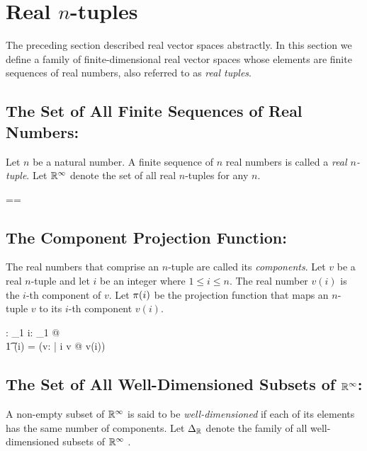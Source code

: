 \documentclass[11pt, oneside]{article}
\begin{document}
\section{Real $n$-tuples}

The preceding section described real vector spaces abstractly.
In this section we define a family of finite-dimensional real vector spaces
whose elements are finite sequences of real numbers, also referred to as \textit{real tuples}.

\subsection{The Set of All Finite Sequences of Real Numbers: }

Let $n$ be a natural number.
A finite sequence of $n$ real numbers is called a {\it real $n$-tuple}.
Let $\mathbb{R}^\infty$ denote the set of all real $n$-tuples for any $n$.

\begin{zed}
	\Rinf == \seq \R
\end{zed}

\subsection{The Component Projection Function: }

The real numbers that comprise an $n$-tuple are called its \textit{components}.
Let $v$ be a real $n$-tuple and let $i$ be an integer where $1 \le i \le n$.
The real number $v(i)$ is the $i$-th component of $v$.
Let $\operatorname{\pi}(i)$ be the projection function that maps an $n$-tuple $v$ to its $i$-th component $v(i)$.

\begin{axdef}
	\piRinf: \nat_1 \fun \Rinf \pfun \R
\where
	\forall i: \nat_1 @ \\
	\t1	\piRinf(i) = (\lambda v: \Rinf | i \in \dom v @ v(i))
\end{axdef}

\subsection{The Set of All Well-Dimensioned Subsets of $\mathbb{R}^\infty$: }

A non-empty subset of $\mathbb{R}^\infty$ is said to be \textit{well-dimensioned} if each of its elements has the same number
of components.
Let $\Delta_{\mathbb{R}}$ denote the family of all well-dimensioned subsets of $\mathbb{R}^\infty$ .
\end{document}
